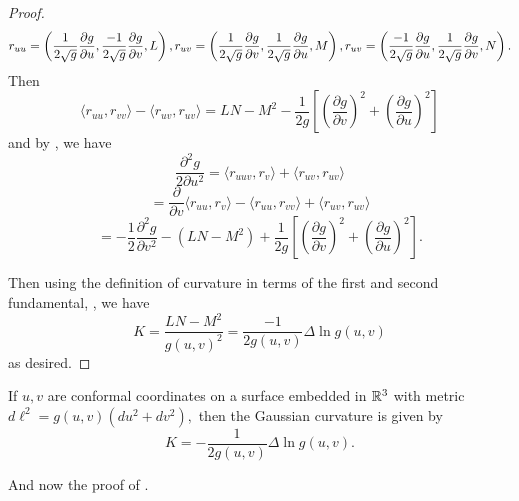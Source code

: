 \begin{proof}
	\begin{equation}\label{eqn:log-curve-proof-seconds}
		r_{uu}=\left(\frac{1}{2\sqrt{g}}\frac{\partial g}{\partial u},\frac{-1}{2\sqrt{g}}\frac{\partial g}{\partial v},L\right),\\
		r_{uv}=\left(\frac{1}{2\sqrt{g}}\frac{\partial g}{\partial v},\frac{1}{2\sqrt{g}}\frac{\partial g}{\partial u},M\right),\\
		r_{uv}=\left(\frac{-1}{2\sqrt{g}}\frac{\partial g}{\partial u},\frac{1}{2\sqrt{g}}\frac{\partial g}{\partial v},N\right).
	\end{equation}
	Then
	$$\langle r_{uu},r_{vv}\rangle -\langle r_{uv},r_{uv}\rangle=LN-M^2-\frac{1}{2g}\left[\left(\frac{\partial g}{\partial v}\right)^2+
	\left(\frac{\partial g}{\partial u}\right)^2\right]$$
	and by , we have
	$$\frac{\partial^2 g}{2\partial u^2}=\langle r_{uuv},r_{v}\rangle+\langle r_{uv},r_{uv}\rangle$$
	$$=\frac{\partial}{\partial v}\langle r_{uu},r_{v}\rangle - \langle r_{uu},r_{vv}\rangle+\langle r_{uv},r_{uv}\rangle$$
	$$=-\frac{1}{2}\frac{\partial^2 g}{\partial v^2}-(LN-M^2)+\frac{1}{2g}\left[\left(\frac{\partial g}{\partial v}\right)^2+
	\left(\frac{\partial g}{\partial u}\right)^2\right].$$
	
	Then using the definition of curvature in terms of the first and second fundamental, ,
	we have
	$$K=\frac{LN-M^2}{g(u,v)^2}=\frac{-1}{2g(u,v)}\Delta \ln g(u,v)$$
	as desired.
\end{proof}







\begin{lemma}\label{lem:lapa-curve}
	If $u,v$ are conformal coordinates on a surface
	embedded in $\mathbb{R}^3$ with metric $d\ell^2=g(u,v)(du^2+dv^2),$
	then the Gaussian curvature is given by
	$$K=-\frac{1}{2g(u,v)}\Delta \ln g(u,v).$$
\end{lemma}



And now the proof of .

